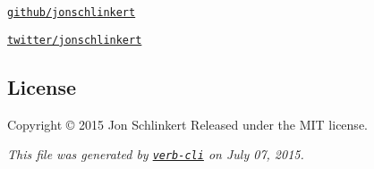 \begin{DoxyItemize}
\item \href{https://github.com/jonschlinkert}{\tt github/jonschlinkert}
\item \href{http://twitter.com/jonschlinkert}{\tt twitter/jonschlinkert}
\end{DoxyItemize}

\subsection*{License}

Copyright © 2015 Jon Schlinkert Released under the M\+IT license.





{\itshape This file was generated by \href{https://github.com/assemble/verb-cli}{\tt verb-\/cli} on July 07, 2015.} 